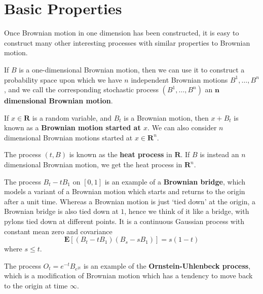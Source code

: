 \section{Basic Properties}

Once Brownian motion in one dimension has been constructed, it is easy to construct many other interesting processes with similar properties to Brownian motion.

\begin{example}
    If $B$ is a one-dimensional Brownian motion, then we can use it to construct a probability space upon which we have $n$ independent Brownian motions $B^1, \dots, B^n$, and we call the corresponding stochastic process $(B^1, \dots, B^n)$ an {\bf $\mathbf{n}$ dimensional Brownian motion}.
\end{example}

\begin{example}
    If $x \in \mathbf{R}$ is a random variable, and $B_t$ is a Brownian motion, then $x + B_t$ is known as a {\bf Brownian motion started at $x$}. We can also consider $n$ dimensional Brownian motions started at $x \in \mathbf{R}^n$.
\end{example}

\begin{example}
    The process $(t,B)$ is known as the {\bf heat process} in $\mathbf{R}$. If $B$ is instead an $n$ dimensional Brownian motion, we get the heat process in $\mathbf{R}^n$.
\end{example}

\begin{example}
    The process $B_t - t B_1$ on $[0,1]$ is an example of a {\bf Brownian bridge}, which models a variant of a Brownian motion which starts and returns to the origin after a unit time. Whereas a Brownian motion is just `tied down' at the origin, a Brownian bridge is also tied down at $1$, hence we think of it like a bridge, with pylons tied down at different points. It is a continuous Gaussian process with constant mean zero and covariance
    \[ \mathbf{E}[(B_t - tB_1)(B_s - sB_1)] = s(1-t) \]
    where $s \leq t$.
\end{example}

\begin{example}
    The process $O_t = e^{-t} B_{e^{2t}}$ is an example of the {\bf Ornstein-Uhlenbeck process}, which is a modification of Brownian motion which has a tendency to move back to the origin at time $\infty$.
\end{example}

